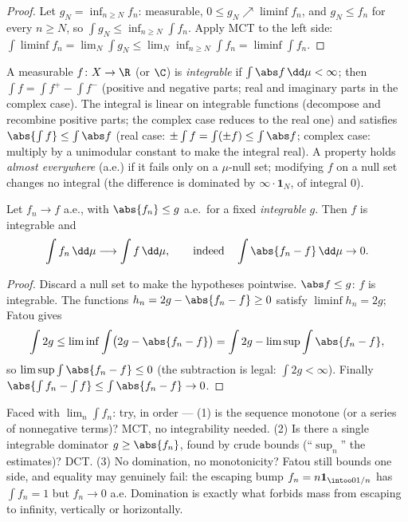 \begin{proof}
Let $g_N = \inf_{n\geq N}f_n$: measurable, $0 \leq g_N \nearrow
\liminf f_n$, and $g_N \leq f_n$ for every $n \geq N$, so
$\int g_N \leq \inf_{n \geq N}\int f_n$. Apply MCT to the left
side: $\int\liminf f_n = \lim_N\int g_N \leq
\lim_N\inf_{n\geq N}\int f_n = \liminf\int f_n$.
\end{proof}

\begin{definition}\label{def:b3:lebesgue:l1}
A measurable $f \colon X \to \R$ (or $\C$) is
\emph{integrable} if $\int\abs
f\,\dd\mu < \infty$; then $\int f = \int f^+ - \int f^-$
(positive and negative parts; real and imaginary parts in the
complex case). The integral is linear on integrable functions
(decompose and recombine positive parts; the complex case
reduces to the real one) and satisfies $\abs{\int f} \leq
\int\abs f$ (real case: $\pm\int f = \int(\pm f) \leq
\int\abs f$; complex case: multiply by a unimodular constant
to make the integral real). A property holds \emph{almost
everywhere} (a.e.) if it fails only on
a $\mu$-null set; modifying $f$ on a null set changes no
integral (the difference is dominated by $\infty\cdot\mathbf
1_N$, of integral $0$).
\end{definition}

\begin{theorem}\label{thm:b3:lebesgue:dct}
Let $f_n \to f$ a.e., with $\abs{f_n} \leq g$ a.e.\ for a fixed
\emph{integrable} $g$. Then $f$ is integrable and
\[
\int f_n\,\dd\mu \longrightarrow \int f\,\dd\mu,
\qquad\text{indeed}\quad \int\abs{f_n - f}\,\dd\mu \to 0 .
\]
\end{theorem}

\begin{proof}
Discard a null set to make the hypotheses pointwise. $\abs f
\leq g$: $f$ is integrable. The functions $h_n = 2g - \abs{f_n
- f} \geq 0$ satisfy $\liminf h_n = 2g$; Fatou gives
\[
\int 2g \leq \liminf\int\bigl(2g - \abs{f_n - f}\bigr)
= \int 2g - \limsup\int\abs{f_n - f},
\]
so $\limsup\int\abs{f_n - f} \leq 0$ (the subtraction is legal:
$\int 2g < \infty$). Finally $\abs{\int f_n - \int f} \leq
\int\abs{f_n - f} \to 0$.
\end{proof}

\begin{method}\label{met:b3:lebesgue:convergence}
Faced with $\lim_n\int f_n$: try, in order --- (1) is the
sequence monotone (or a series of nonnegative terms)? MCT, no
integrability needed. (2) Is there a single integrable
dominator $g \geq \abs{f_n}$, found by crude bounds
(``$\sup_n$'' the estimates)? DCT. (3) No domination, no
monotonicity? Fatou still bounds one side, and equality may
genuinely fail: the escaping bump $f_n = n\mathbf
1_{\intoo0{1/n}}$ has $\int f_n = 1$ but $f_n \to 0$ a.e.
Domination is exactly what forbids mass from escaping to
infinity, vertically or horizontally.
\end{method}

